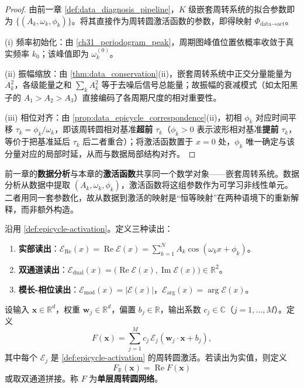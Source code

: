 \begin{proof}
由前一章 \cref{def:data_diagnosis_pipeline}，$K$ 级嵌套周转系统的拟合参数即为 $\{(A_k,\omega_k,\phi_k)\}$。将其直接作为周转圆激活函数的参数，即得映射 $\Phi_{\text{data}\to\text{act}}$。

(i) 频率初始化：由 \cref{ch31_periodogram_peak}，周期图峰值位置依概率收敛于真实频率 $k_0$；该峰值即为 $\omega_k^{(0)}$。

(ii) 振幅缩放：由 \cref{thm:data_conservation}(ii)，嵌套周转系统中正交分量能量为 $A_k^2$，各级能量之和 $\sum_k A_k^2$ 等于去噪后信号总能量；故振幅的衰减模式（如太阳黑子的 $A_1 > A_2 > A_3$）直接编码了各周期尺度的相对重要性。

(iii) 相位对齐：由 \cref{prop:data_epicycle_correspondence}(ii)，初相 $\phi_k$ 对应时间平移 $\tau_k = \phi_k/\omega_k$，即该周转圆相对基准\textbf{超前} $\tau_k$（$\phi_k>0$ 表示波形相对基准\textbf{提前} $\tau_k$，等价于把基准延后 $\tau_k$ 后二者重合）；将激活函数置于 $x=0$ 处，$\phi_k$ 唯一确定与该分量对应的局部时延，从而与数据局部结构对齐。
\end{proof}

\begin{remark}\label{rem:mapping_naturalness}
前一章的\textbf{数据分析}与本章的\textbf{激活函数}共享同一个数学对象——嵌套周转系统。数据分析从数据中提取 $(A_k,\omega_k,\phi_k)$，激活函数将这组参数作为可学习非线性单元。二者用同一套参数化，故从数据到激活的映射是“恒等映射”在两种语境下的重新解释，而非额外构造。
\end{remark}

\begin{definition}\label{def:epicycle-readout}
沿用 \cref{def:epicycle-activation}。定义三种读出：
\begin{enumerate}[label=(\roman*)]
    \item \textbf{实部读出}：$\mathcal E_{\mathrm{Re}}(x)=\operatorname{Re}\mathcal E(x)=\sum_{k=1}^{N}A_k\cos(\omega_k x+\phi_k)$。
    \item \textbf{双通道读出}：$\mathcal E_{\mathrm{dual}}(x)=\bigl(\operatorname{Re}\mathcal E(x),\operatorname{Im}\mathcal E(x)\bigr)\in\mathbb R^2$。
    \item \textbf{模长-相位读出}：$\mathcal E_{\mathrm{mod}}(x)=|\mathcal E(x)|$，$\mathcal E_{\mathrm{arg}}(x)=\arg\mathcal E(x)$。
\end{enumerate}
\end{definition}

\begin{definition}[单层周转圆网络]\label{def:single-layer-epicycle-network}
设输入 $\mathbf x\in\mathbb R^d$，权重 $\mathbf w_j\in\mathbb R^d$，偏置 $b_j\in\mathbb R$，输出系数 $c_j\in\mathbb C$（$j=1,\dots,M$）。定义
\[
F(\mathbf x)=\sum_{j=1}^{M}c_j\,\mathcal E_j(\mathbf w_j\cdot\mathbf x+b_j),
\]
其中每个 $\mathcal E_j$ 是 \cref{def:epicycle-activation} 的周转圆激活。若读出为实值，则定义
\[
F_{\mathbb R}(\mathbf x)=\operatorname{Re}F(\mathbf x)
\]
或取双通道拼接。称 $F$ 为\textbf{单层周转圆网络}。
\end{definition}

